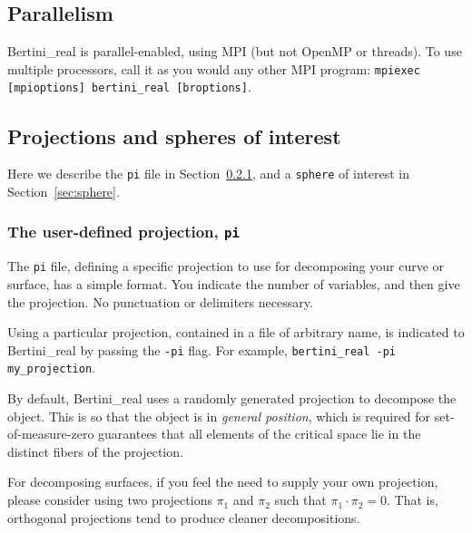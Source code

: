 	\subsection{Parallelism}

Bertini\_real is parallel-enabled, using MPI (but not OpenMP or threads). To use multiple processors, call it as you would any other MPI program: \texttt{mpiexec [mpioptions] bertini\_real [broptions]}.






\subsection{Projections and spheres of interest}


 Here we describe the {\tt pi} file in Section~\ref{sec:pi}, and a {\tt sphere} of interest in Section~\ref{sec:sphere}.

\subsubsection{The user-defined projection, \texttt{pi}}
\label{sec:pi}

The {\tt pi} file, defining a specific projection to use for decomposing your curve or surface, has a simple format.  You indicate the number of variables, and then give the projection.  No punctuation or delimiters necessary.

Using a particular projection, contained in a file of arbitrary name, is indicated to Bertini\_real by passing the {\tt -pi} flag.  For example, {\tt bertini\_real -pi my\_projection}.

By default, Bertini\_real uses a randomly generated projection to decompose the object.  This is so that the object is in {\em general position}, which is required for set-of-measure-zero guarantees that all elements of the critical space lie in the distinct fibers of the projection.


For decomposing surfaces, if you feel the need to supply your own projection, please consider using two projections $\pi_1$ and $\pi_2$ such that $\pi_1 \cdot \pi_2 = 0$.  That is, orthogonal projections tend to produce cleaner decompositions.



